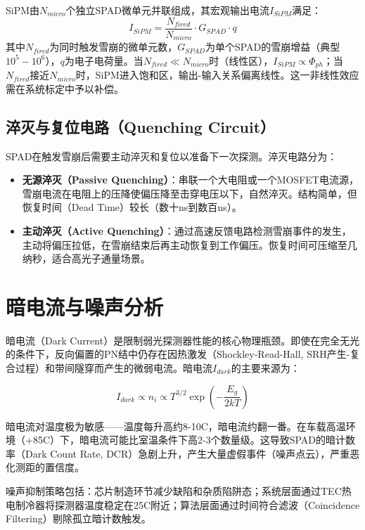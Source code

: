 \documentclass[12pt,a4paper,openany,UTF8]{ctexbook}
\begin{document}
SiPM由$N_{micro}$个独立SPAD微单元并联组成，其宏观输出电流$I_{SiPM}$满足：
\begin{equation}\label{eq:sipm_current}
I_{SiPM} = \frac{N_{fired}}{N_{micro}} \cdot G_{SPAD} \cdot q
\end{equation}
其中$N_{fired}$为同时触发雪崩的微单元数，$G_{SPAD}$为单个SPAD的雪崩增益（典型$10^5-10^6$），$q$为电子电荷量。当$N_{fired} \ll N_{micro}$时（线性区），$I_{SiPM} \propto \Phi_{ph}$；当$N_{fired}$接近$N_{micro}$时，SiPM进入饱和区，输出-输入关系偏离线性。这一非线性效应需在系统标定中予以补偿。

\subsection{淬灭与复位电路（Quenching Circuit）}

SPAD在触发雪崩后需要主动淬灭和复位以准备下一次探测。淬灭电路分为：
\begin{itemize}
    \item \textbf{无源淬灭（Passive Quenching）}：串联一个大电阻或一个MOSFET电流源，雪崩电流在电阻上的压降使偏压降至击穿电压以下，自然淬灭。结构简单，但恢复时间（Dead Time）较长（数十ns到数百ns）。
    \item \textbf{主动淬灭（Active Quenching）}：通过高速反馈电路检测雪崩事件的发生，主动将偏压拉低，在雪崩结束后再主动恢复到工作偏压。恢复时间可压缩至几纳秒，适合高光子通量场景。
\end{itemize}

\section{暗电流与噪声分析}

暗电流（Dark Current）是限制弱光探测器性能的核心物理瓶颈。即使在完全无光的条件下，反向偏置的PN结中仍存在因热激发（Shockley-Read-Hall, SRH产生-复合过程）和带间隧穿而产生的微弱电流。暗电流$I_{dark}$的主要来源为：

\begin{equation}\label{eq:dark_current}
I_{dark} \propto n_i \propto T^{3/2} \exp\left(-\frac{E_g}{2kT}\right)
\end{equation}

暗电流对温度极为敏感——温度每升高约8-10\textdegree C，暗电流约翻一番。在车载高温环境（+85\textdegree C）下，暗电流可能比室温条件下高2-3个数量级。这导致SPAD的暗计数率（Dark Count Rate, DCR）急剧上升，产生大量虚假事件（噪声点云），严重恶化测距的置信度。

噪声抑制策略包括：芯片制造环节减少缺陷和杂质陷阱态；系统层面通过TEC热电制冷器将探测器温度稳定在25\textdegree C附近；算法层面通过时间符合滤波（Coincidence Filtering）剔除孤立暗计数触发。
\end{document}
